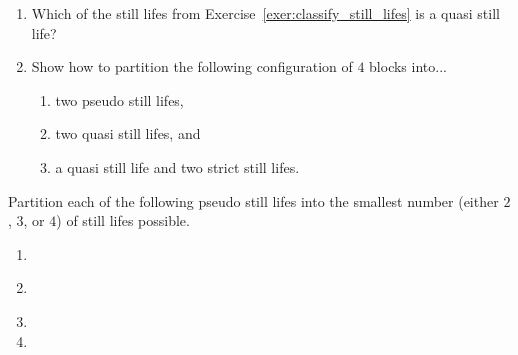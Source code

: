 \begin{multicols}{2}
\begin{problem}
		\begin{enumerate}[label=\bf\color{ocre}(\alph*)]
			\item Which of the still lifes from Exercise~\ref{exer:classify_still_lifes} is a quasi still life?
			
			\item Show how to partition the following configuration of $4$ blocks into...
			
			\begin{center}
			\end{center}
			
			\begin{enumerate}[label=\bf\color{ocre}(\roman*)]
				\item two pseudo still lifes,
				
				\item two quasi still lifes, and
				
				\item a quasi still life and two strict still lifes.
			\end{enumerate}
		\end{enumerate}
	\end{problem}
	
	
	\mfilbreak
	
	
	\begin{problemstar}\label{exer:pseudo_few_colors}
		Partition each of the following pseudo still lifes into the smallest number (either $2$, $3$, or $4$) of still lifes possible.\setlength{\columnsep}{0pt}\vspace*{-0.25cm}
		
		\begin{multicols}{2}
			\begin{enumerate}[label=(\alph*),series=exer_pseudo]
				\item[\bf\color{ocre}(a)] 
				
				\item[\bf\color{ocre}(c)] \\[1.0em]
				
				\item[\bf\color{ocre}(e)] 
				
				\item[\bf\color{ocre}(b)] 
				

\end{enumerate}
\end{multicols}
\end{problemstar}
\end{multicols}
